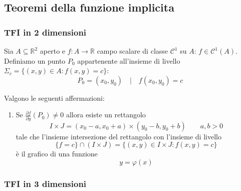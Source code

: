 \documentclass[x11names]{article}
\begin{document}
	\subsection{Teoremi della funzione implicita}
	\begin{center}
	\colorbox{myred}{\begin{minipage}{5.75in}
		\begin{redes}{}
		\subsubsection{TFI in 2 dimensioni}
		Sia \(A \subseteq \mathbb{R}^2\) aperto e \(f: A\to \mathbb{R}\) campo scalare di classe \(\mathcal{C^1}\) su \(A\): \(f\in \mathcal{C}^1(A)\). \\
		
		Definiamo un punto \(P_{0}\) appartenente all'insieme di livello \(\Sigma_c = \{(x,y) \in A : f(x,y) = c\}\):
		\[
		P_{0} = (x_{0},y_{0}) \quad | \quad f(x_{0},y_{0}) = c
		\]
		
		Valgono le seguenti affermazioni:
		\begin{enumerate}
			\item Se \(\frac{\partial f}{\partial y}(P_{0}) \neq 0\) allora esiste un rettangolo 
			\[ 
			I\times J = (x_{0} - a, x_{0} + a) \times (y_{0} - b, y_{0} + b) \qquad a,b > 0
			\]
			tale che l'insieme intersezione del rettangolo con l'insieme di livello
			\[ 
			\{f=c\} \cap (I\times J) = \{(x,y) \in I \times J : f(x,y) = c\}
			\]
			è il grafico di una funzione 
			\[ 
			y = \varphi(x)
			\]
		\end{enumerate}
		\end{redes}
	\end{minipage}}        
	\end{center}
	\begin{center}
	\colorbox{myred}{\begin{minipage}{5.75in}
		\begin{redes}{}
		\subsubsection{TFI in 3 dimensioni}
		\end{redes}
	\end{minipage}}        
	\end{center}
\end{document}
